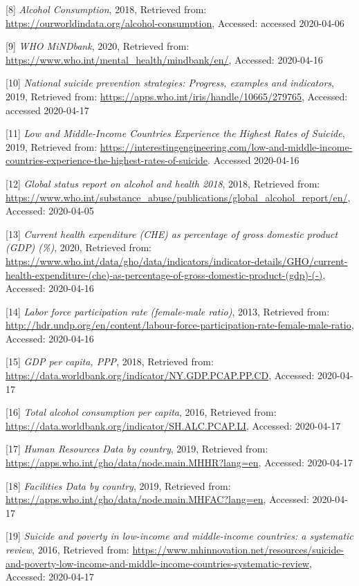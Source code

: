 \documentclass[]{article}
\begin{document}
{[}8{]} \emph{Alcohol Consumption}, 2018, Retrieved from:
\url{https://ourworldindata.org/alcohol-consumption}, Accessed: accessed
2020-04-06

{[}9{]} \emph{WHO MiNDbank}, 2020, Retrieved from:
\url{https://www.who.int/mental_health/mindbank/en/}, Accessed:
2020-04-16

{[}10{]} \emph{National suicide prevention strategies: Progress,
examples and indicators}, 2019, Retrieved from:
\url{https://apps.who.int/iris/handle/10665/279765}, Accessed: accessed
2020-04-17

{[}11{]} \emph{Low and Middle-Income Countries Experience the Highest
Rates of Suicide}, 2019, Retrieved from:
\url{https://interestingengineering.com/low-and-middle-income-countries-experience-the-highest-rates-of-suicide}.
Accessed 2020-04-16

{[}12{]} \emph{Global status report on alcohol and health 2018}, 2018,
Retrieved from:
\url{https://www.who.int/substance_abuse/publications/global_alcohol_report/en/},
Accessed: 2020-04-05

{[}13{]} \emph{Current health expenditure (CHE) as percentage of gross
domestic product (GDP) (\%)}, 2020, Retrieved from:
\url{https://www.who.int/data/gho/data/indicators/indicator-details/GHO/current-health-expenditure-(che)-as-percentage-of-gross-domestic-product-(gdp)-(-)},
Accessed: 2020-04-16

{[}14{]} \emph{Labor force participation rate (female-male ratio)},
2013, Retrieved from:
\url{http://hdr.undp.org/en/content/labour-force-participation-rate-female-male-ratio},
Accessed: 2020-04-16

{[}15{]} \emph{GDP per capita, PPP}, 2018, Retrieved from:
\url{https://data.worldbank.org/indicator/NY.GDP.PCAP.PP.CD}, Accessed:
2020-04-17

{[}16{]} \emph{Total alcohol consumption per capita}, 2016, Retrieved
from: \url{https://data.worldbank.org/indicator/SH.ALC.PCAP.LI},
Accessed: 2020-04-17

{[}17{]} \emph{Human Resources Data by country}, 2019, Retrieved from:
\url{https://apps.who.int/gho/data/node.main.MHHR?lang=en}, Accessed:
2020-04-17

{[}18{]} \emph{Facilities Data by country}, 2019, Retrieved from:
\url{https://apps.who.int/gho/data/node.main.MHFAC?lang=en}, Accessed:
2020-04-17

{[}19{]} \emph{Suicide and poverty in low-income and middle-income
countries: a systematic review}, 2016, Retrieved from:
\url{https://www.mhinnovation.net/resources/suicide-and-poverty-low-income-and-middle-income-countries-systematic-review},
Accessed: 2020-04-17
\end{document}
